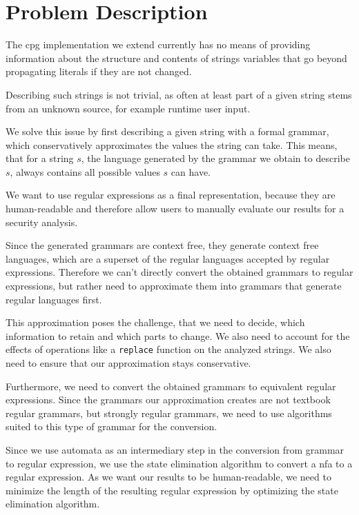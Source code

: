 \chapter{Problem Description}
\label{chapter:ProblemDescription}

The \ac{cpg} implementation we extend currently has no means of providing information about the structure and contents of strings variables that go beyond propagating literals if they are not changed.

Describing such strings is not trivial, as often at least part of a given string stems from an unknown source, for example runtime user input.

We solve this issue by first describing a given string with a formal grammar, which conservatively approximates the values the string can take.
This means, that for a string $s$, the language generated by the grammar we obtain to describe $s$, always contains all possible values $s$ can have.

We want to use regular expressions as a final representation, because they are human-readable and therefore allow users to manually evaluate our results for a security analysis.

Since the generated grammars are context free, they generate context free languages, which are a superset of the regular languages accepted by regular expressions. Therefore we can't directly convert the obtained grammars to regular expressions, but rather need to approximate them into grammars that generate regular languages first.

This approximation poses the challenge, that we need to decide, which information to retain and which parts to change. We also need to account for the effects of operations like a \lstinline|replace| function on the analyzed strings. We also need to ensure that our approximation stays conservative.

Furthermore, we need to convert the obtained grammars to equivalent regular expressions. Since the grammars our approximation creates are not textbook regular grammars, but strongly regular grammars, we need to use algorithms suited to this type of grammar for the conversion.

Since we use automata as an intermediary step in the conversion from grammar to regular expression, we use the state elimination algorithm \cite{brzozowksi_mccluskey} to convert a \ac{nfa} to a regular expression. As we want our results to be human-readable, we need to minimize the length of the resulting regular expression by optimizing the state elimination algorithm.

